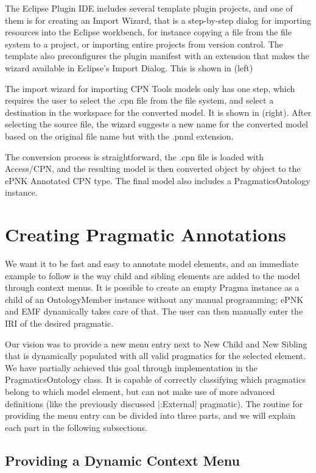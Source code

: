 The Eclipse Plugin IDE includes several template plugin projects, and one of
them is for creating an Import Wizard, that is a step-by-step dialog for
importing resources into the Eclipse workbench, for instance copying a file from
the file system to a project, or importing entire projects from version control.
The template also preconfigures the plugin manifest with an extension that makes
the wizard available in Eclipse's Import Dialog. This is shown in
 (left)

The import wizard for importing CPN Tools models only has one step, which
requires the user to select the .cpn file from the file system, and select a
destination in the workspace for the converted model. It is shown in
 (right). After selecting the source file, the wizard
suggests a new name for the converted model based on the original file name but with the
.pnml extension.

The conversion process is straightforward, the .cpn file is loaded with
Access/CPN, and the resulting model is then converted object by object to the
ePNK Annotated CPN type. The final model also includes a PragmaticsOntology
instance.

\section{Creating Pragmatic Annotations}
We want it to be fast and easy to annotate model elements, and an immediate
example to follow is the way child and sibling elements are added to the model
through context menus. It is possible to create an empty Pragma instance as a
child of an OntologyMember instance without any manual programming; ePNK and EMF
dynamically takes care of that. The user can then manually enter the IRI of the
desired pragmatic.

Our vision was to provide a new menu entry next to New Child and New
Sibling that is dynamically populated with all valid pragmatics for the selected
element.
We have partially achieved this goal through implementation in the PragmaticsOntology
class. It is capable of correctly classifying which pragmatics belong to which
model element, but can not make use of more advanced definitions (like the
previously discussed |:External| pragmatic). The routine for providing the menu
entry can be divided into three parts, and we will explain each part in the
following subsections.

	\subsection{Providing a Dynamic Context Menu}
	
